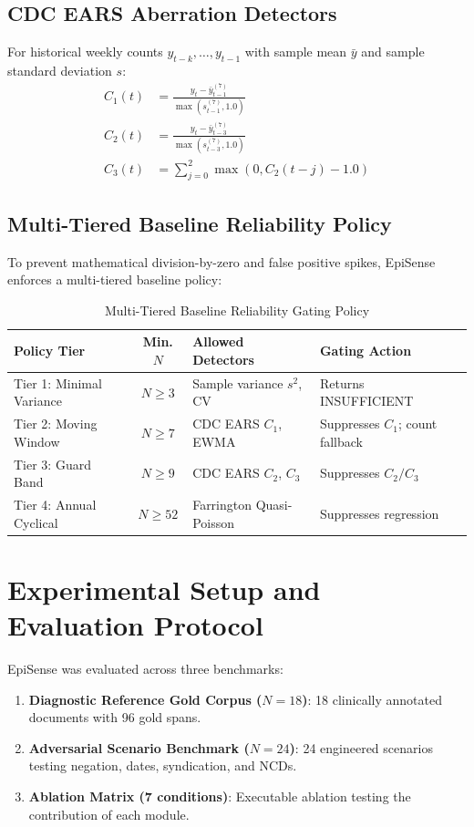\documentclass[conference]{IEEEtran}
\begin{document}
\subsection{CDC EARS Aberration Detectors}
For historical weekly counts $y_{t-k}, \dots, y_{t-1}$ with sample mean $\bar{y}$ and sample standard deviation $s$:
\begin{align}
C_1(t) &= \frac{y_t - \bar{y}_{t-1}^{(7)}}{\max(s_{t-1}^{(7)}, 1.0)} \\
C_2(t) &= \frac{y_t - \bar{y}_{t-3}^{(7)}}{\max(s_{t-3}^{(7)}, 1.0)} \\
C_3(t) &= \sum_{j=0}^{2} \max(0, C_2(t-j) - 1.0)
\end{align}

\subsection{Multi-Tiered Baseline Reliability Policy}
To prevent mathematical division-by-zero and false positive spikes, EpiSense enforces a multi-tiered baseline policy:

\begin{table}[htbp]
\caption{Multi-Tiered Baseline Reliability Gating Policy}
\label{tab:baseline}
\begin{center}
\begin{tabular}{lcll}
\toprule
\textbf{Policy Tier} & \textbf{Min. $N$} & \textbf{Allowed Detectors} & \textbf{Gating Action} \\
\midrule
Tier 1: Minimal Variance & $N \ge 3$ & Sample variance $s^2$, CV & Returns INSUFFICIENT \\
Tier 2: Moving Window & $N \ge 7$ & CDC EARS $C_1$, EWMA & Suppresses $C_1$; count fallback \\
Tier 3: Guard Band & $N \ge 9$ & CDC EARS $C_2$, $C_3$ & Suppresses $C_2/C_3$ \\
Tier 4: Annual Cyclical & $N \ge 52$ & Farrington Quasi-Poisson & Suppresses regression \\
\bottomrule
\end{tabular}
\end{center}
\end{table}

\section{Experimental Setup and Evaluation Protocol}
EpiSense was evaluated across three benchmarks:
\begin{enumerate}
    \item \textbf{Diagnostic Reference Gold Corpus ($N=18$)}: 18 clinically annotated documents with 96 gold spans.
    \item \textbf{Adversarial Scenario Benchmark ($N=24$)}: 24 engineered scenarios testing negation, dates, syndication, and NCDs.
    \item \textbf{Ablation Matrix (7 conditions)}: Executable ablation testing the contribution of each module.
\end{enumerate}
\end{document}
